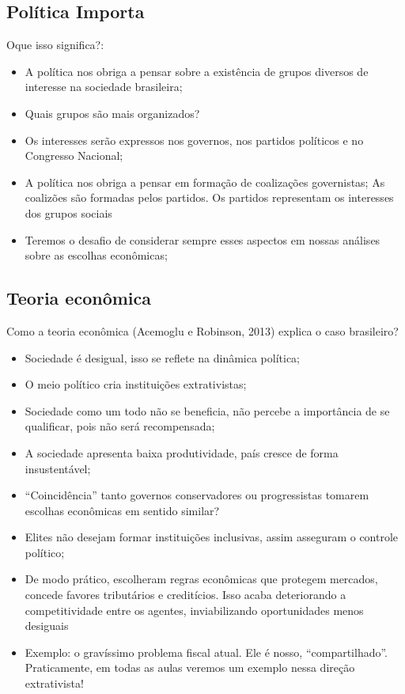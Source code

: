 \documentclass[a4paper,12pt]{article}[abntex2]
\begin{document}
\subsection{\textbf{Política Importa}}
Oque isso significa?:\begin{itemize}
    \item A política nos obriga a pensar sobre a existência de grupos diversos de interesse na sociedade brasileira;
    \item Quais grupos são mais organizados?
    \item Os interesses serão expressos nos governos, nos partidos políticos e no Congresso Nacional;
    \item A política nos obriga a pensar em formação de coalizações governistas; As coalizões são formadas pelos partidos. Os partidos representam os interesses dos grupos sociais
    \item Teremos o desafio de considerar sempre esses aspectos em nossas análises sobre as escolhas econômicas;
\end{itemize}

\subsection{\textbf{Teoria econômica}}
Como a teoria econômica (Acemoglu e Robinson, 2013) explica o caso brasileiro?\begin{itemize}
    \item Sociedade é desigual, isso se reflete na dinâmica política;
    \item O meio político cria instituições extrativistas;
    \item Sociedade como um todo não se beneficia, não percebe a importância de se qualificar, pois não será recompensada;
    \item A sociedade apresenta baixa produtividade, país cresce de forma insustentável;
    \item “Coincidência” tanto governos conservadores ou progressistas tomarem escolhas econômicas em sentido similar?
    \item Elites não desejam formar instituições inclusivas, assim asseguram o controle político;
    \item De modo prático, escolheram regras econômicas que protegem mercados, concede favores tributários e creditícios. Isso acaba deteriorando a competitividade entre os agentes, inviabilizando oportunidades menos desiguais
    \item Exemplo: o gravíssimo problema fiscal atual. Ele é nosso, “compartilhado”. Praticamente, em todas as aulas veremos um exemplo nessa direção extrativista!
\end{itemize}
\end{document}
